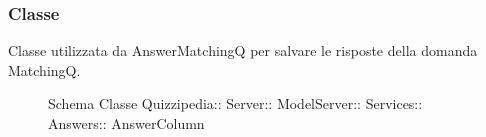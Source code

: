 \subsubsection{Classe }
Classe utilizzata da AnswerMatchingQ per salvare le risposte della domanda MatchingQ.
\begin{figure}[H]
\centering
\noindent{}
\caption[Schema Classe AnswerColumn]{Schema Classe Quizzipedia:: Server:: ModelServer:: Services:: Answers:: AnswerColumn}
\end{figure}
